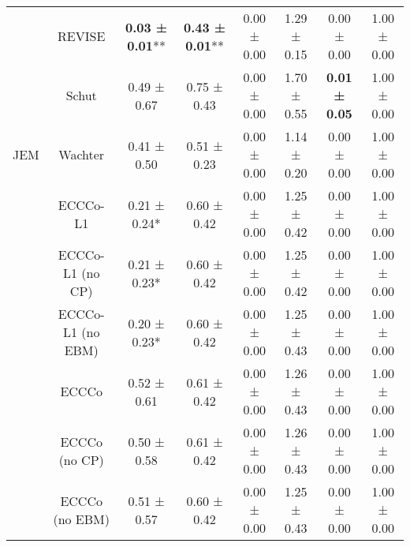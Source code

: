 \begin{table}
{\begin{tabular}[t]{cccccccc}
 & REVISE & \textbf{0.03 ± 0.01}** & \textbf{0.43 ± 0.01}** & 0.00 ± 0.00\hphantom{*}\hphantom{*} & 1.29 ± 0.15\hphantom{*}\hphantom{*} & 0.00 ± 0.00\hphantom{*}\hphantom{*} & 1.00 ± 0.00\hphantom{*}\hphantom{*}\\

 & Schut & 0.49 ± 0.67\hphantom{*}\hphantom{*} & 0.75 ± 0.43\hphantom{*}\hphantom{*} & 0.00 ± 0.00\hphantom{*}\hphantom{*} & 1.70 ± 0.55\hphantom{*}\hphantom{*} & \textbf{0.01 ± 0.05}\hphantom{*}\hphantom{*} & 1.00 ± 0.00\hphantom{*}\hphantom{*}\\

\multirow[t]{-9}{*}{\centering\arraybackslash JEM} & Wachter & 0.41 ± 0.50\hphantom{*}\hphantom{*} & 0.51 ± 0.23\hphantom{*}\hphantom{*} & 0.00 ± 0.00\hphantom{*}\hphantom{*} & 1.14 ± 0.20\hphantom{*}\hphantom{*} & 0.00 ± 0.00\hphantom{*}\hphantom{*} & 1.00 ± 0.00\hphantom{*}\hphantom{*}\\
\cmidrule{1-8}
 & ECCCo-L1 & 0.21 ± 0.24*\hphantom{*} & 0.60 ± 0.42\hphantom{*}\hphantom{*} & 0.00 ± 0.00\hphantom{*}\hphantom{*} & 1.25 ± 0.42\hphantom{*}\hphantom{*} & 0.00 ± 0.00\hphantom{*}\hphantom{*} & 1.00 ± 0.00\hphantom{*}\hphantom{*}\\

 & ECCCo-L1 (no CP) & 0.21 ± 0.23*\hphantom{*} & 0.60 ± 0.42\hphantom{*}\hphantom{*} & 0.00 ± 0.00\hphantom{*}\hphantom{*} & 1.25 ± 0.42\hphantom{*}\hphantom{*} & 0.00 ± 0.00\hphantom{*}\hphantom{*} & 1.00 ± 0.00\hphantom{*}\hphantom{*}\\

 & ECCCo-L1 (no EBM) & 0.20 ± 0.23*\hphantom{*} & 0.60 ± 0.42\hphantom{*}\hphantom{*} & 0.00 ± 0.00\hphantom{*}\hphantom{*} & 1.25 ± 0.43\hphantom{*}\hphantom{*} & 0.00 ± 0.00\hphantom{*}\hphantom{*} & 1.00 ± 0.00\hphantom{*}\hphantom{*}\\

 & ECCCo & 0.52 ± 0.61\hphantom{*}\hphantom{*} & 0.61 ± 0.42\hphantom{*}\hphantom{*} & 0.00 ± 0.00\hphantom{*}\hphantom{*} & 1.26 ± 0.43\hphantom{*}\hphantom{*} & 0.00 ± 0.00\hphantom{*}\hphantom{*} & 1.00 ± 0.00\hphantom{*}\hphantom{*}\\

 & ECCCo (no CP) & 0.50 ± 0.58\hphantom{*}\hphantom{*} & 0.61 ± 0.42\hphantom{*}\hphantom{*} & 0.00 ± 0.00\hphantom{*}\hphantom{*} & 1.26 ± 0.43\hphantom{*}\hphantom{*} & 0.00 ± 0.00\hphantom{*}\hphantom{*} & 1.00 ± 0.00\hphantom{*}\hphantom{*}\\

 & ECCCo (no EBM) & 0.51 ± 0.57\hphantom{*}\hphantom{*} & 0.60 ± 0.42\hphantom{*}\hphantom{*} & 0.00 ± 0.00\hphantom{*}\hphantom{*} & 1.25 ± 0.43\hphantom{*}\hphantom{*} & 0.00 ± 0.00\hphantom{*}\hphantom{*} & 1.00 ± 0.00\hphantom{*}\hphantom{*}\\


\end{tabular}}
\end{table}
